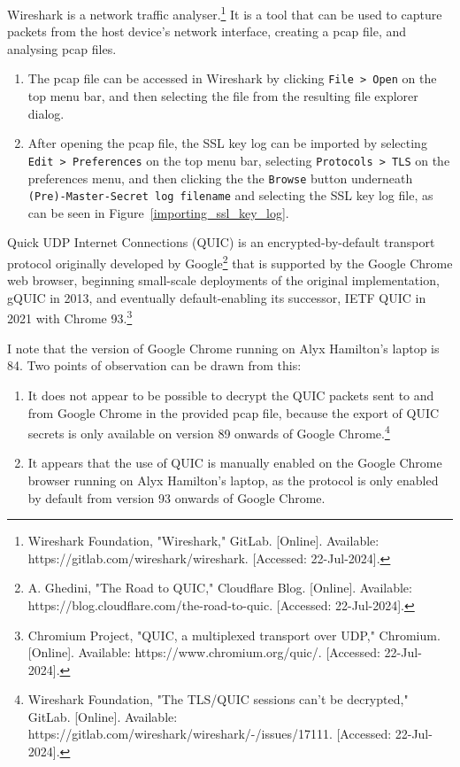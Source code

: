 \begin{myenum}
	\item Wireshark is a network traffic analyser.\footnote{Wireshark Foundation, "Wireshark," GitLab. [Online]. Available: https://gitlab.com/wireshark/wireshark. [Accessed: 22-Jul-2024].} It is a tool that can be used to capture packets from the host device's network interface, creating a pcap file, and analysing pcap files.
		\begin{enumerate}
			\item The pcap file can be accessed in Wireshark by clicking \texttt{File > Open}  on the top menu bar, and then selecting the file from the resulting file explorer dialog.
			\item After opening the pcap file, the SSL key log can be imported by selecting \texttt{Edit > Preferences} on the top menu bar, selecting \texttt{Protocols > TLS} on the preferences menu, and then clicking the the \texttt{Browse} button underneath \texttt{(Pre)-Master-Secret log filename} and selecting the SSL key log file, as can be seen in Figure~\ref{importing_ssl_key_log}.
		\end{enumerate}
	\item Quick UDP Internet Connections (QUIC) is an encrypted-by-default transport protocol originally developed by Google\footnote{A. Ghedini, "The Road to QUIC," Cloudflare Blog. [Online]. Available: https://blog.cloudflare.com/the-road-to-quic. [Accessed: 22-Jul-2024].} that is supported by the Google Chrome web browser, beginning small-scale deployments of the original implementation, gQUIC in 2013, and eventually default-enabling its successor, IETF QUIC in 2021 with Chrome 93.\footnote{Chromium Project, "QUIC, a multiplexed transport over UDP," Chromium. [Online]. Available: https://www.chromium.org/quic/. [Accessed: 22-Jul-2024].}
	\item I note that the version of Google Chrome running on Alyx Hamilton's laptop is 84. Two points of observation can be drawn from this:
		\begin{enumerate}
			\item It does not appear to be possible to decrypt the QUIC packets sent to and from Google Chrome in the provided pcap file, because the export of QUIC secrets is only available on version 89 onwards of Google Chrome.\footnote{Wireshark Foundation, "The TLS/QUIC sessions can't be decrypted," GitLab. [Online]. Available: https://gitlab.com/wireshark/wireshark/-/issues/17111. [Accessed: 22-Jul-2024].}
			\item It appears that the use of QUIC is manually enabled on the Google Chrome browser running on Alyx Hamilton's laptop, as the protocol is only enabled by default from version 93 onwards of Google Chrome.
		\end{enumerate}
\end{myenum}


